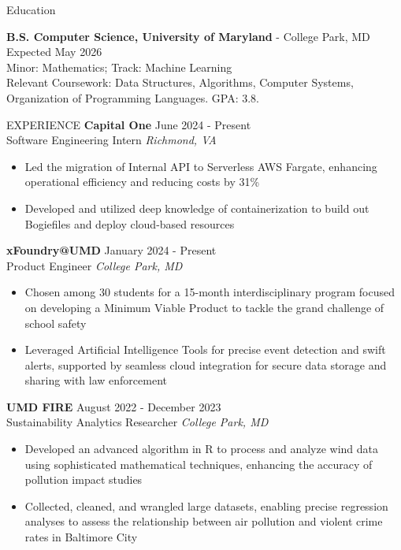 \documentclass{resume} %
\begin{document}

\begin{rSection}{Education}

{\bf B.S. Computer Science, University of Maryland} - College Park, MD \hfill Expected May 2026\\
Minor: Mathematics; Track: Machine Learning \\
Relevant Coursework: Data Structures, Algorithms, Computer Systems, Organization of Programming Languages. GPA: 3.8.

\begin{rSection}{EXPERIENCE}
\textbf{Capital One} \hfill June 2024 - Present\\
Software Engineering Intern \hfill \textit{Richmond, VA}
\begin{itemize}
    \itemsep -3pt {} 
     \item Led the migration of Internal API to Serverless AWS Fargate, enhancing operational efficiency and reducing costs by 31\%
    \item Developed and utilized deep knowledge of containerization to build out Bogiefiles and deploy cloud-based resources
 \end{itemize}

\textbf{xFoundry@UMD} \hfill January 2024 - Present\\
Product Engineer \hfill \textit{College Park, MD}
 \begin{itemize}
    \itemsep -3pt {} 
     \item Chosen among 30 students for a 15-month interdisciplinary program focused on developing a Minimum Viable Product to tackle the grand challenge of school safety
     \item Leveraged Artificial Intelligence Tools for precise event detection and swift alerts, supported by seamless cloud integration for secure data storage and sharing with law enforcement
 \end{itemize}
 
\textbf{UMD FIRE} \hfill August 2022 - December 2023\\
Sustainability Analytics Researcher \hfill \textit{College Park, MD}
 \begin{itemize}
    \itemsep -3pt {}
    \item Developed an advanced algorithm in R to process and analyze wind data using sophisticated mathematical techniques, enhancing the accuracy of pollution impact studies
    \item Collected, cleaned, and wrangled large datasets, enabling precise regression analyses to assess the relationship between air pollution and violent crime rates in Baltimore City
 \end{itemize}
 

\end{rSection}
\end{rSection}
\end{document}
